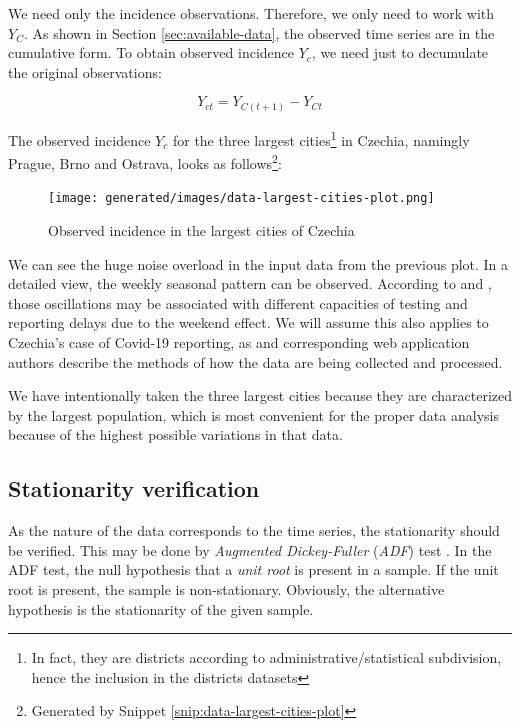 \documentclass[
  digital, %
  oneside, %
  lof,     %
  lot,     %
]{fithesis4}
\begin{document}
We need only the incidence observations. Therefore, we only need to work with $Y_C$.
As shown in Section \ref{sec:available-data}, the observed time series are in the cumulative form.
To obtain observed incidence $Y_c$, we need just to decumulate the original observations:

\begin{equation}
  Y_{ct} = Y_{C(t + 1)} - Y_{Ct}
\end{equation}

The observed incidence $Y_c$ for the three largest 
cities\footnote{In fact, they are districts according to 
administrative/statistical subdivision, hence the inclusion in the districts datasets} in Czechia, 
namingly Prague, Brno and Ostrava, looks as 
follows\footnote{Generated by Snippet 
\ref{snip:data-largest-cities-plot}}:

\begin{figure}[H]
  \begin{center}
    \texttt{[image: generated/images/data-largest-cities-plot.png]}
  \end{center}
  \caption{Observed incidence in the largest cities of Czechia}
  \label{fig:largest-cities-incidence}
\end{figure}

We can see the huge noise overload in the input data from the previous plot. 
In a detailed view, the weekly seasonal pattern can be observed. 
According to \cite{liu2021} and \cite{annunziato2020}, those oscillations may be associated with different capacities of testing and reporting delays due to the weekend effect. 
We will assume this also applies to Czechia's case of Covid-19 reporting, as \cite{komenda2020} and corresponding web application authors describe the methods of how the data are being collected and processed.

We have intentionally taken the three largest cities because they are characterized by the largest population, which is most convenient for the proper data analysis because of the highest possible variations in that data.


\subsection{Stationarity verification}

As the nature of the data corresponds to the time series, the stationarity should be verified. 
This may be done by \textit{Augmented Dickey-Fuller} (\textit{ADF}) test \cite{dickey1979}. 
In the ADF test, the null hypothesis that a \textit{unit root} is present in a sample. 
If the unit root is present, the sample is non-stationary. 
Obviously, the alternative hypothesis is the stationarity of the given sample.
\end{document}
